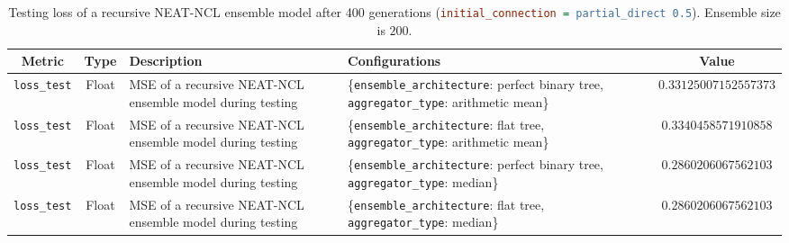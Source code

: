 \begin{table}[H]
    \centering
    \begin{tabular}{|c|c|p{4cm}|p{5cm}|c|}
        \hline
        Metric & Type & Description & Configurations & Value \\
        \hline
        \small\texttt{loss\_test} & Float & MSE of a recursive NEAT-NCL ensemble model during testing & \{\texttt{ensemble\_architecture}: perfect binary tree, \texttt{aggregator\_type}: arithmetic mean\} & $0.33125007152557373$ \\
        \hline
        \small\texttt{loss\_test} & Float & MSE of a recursive NEAT-NCL ensemble model during testing & \{\texttt{ensemble\_architecture}: flat tree, \texttt{aggregator\_type}: arithmetic mean\} & $0.3340458571910858$ \\
        \hline
        \small\texttt{loss\_test} & Float & MSE of a recursive NEAT-NCL ensemble model during testing & \{\texttt{ensemble\_architecture}: perfect binary tree, \texttt{aggregator\_type}: median\} & $0.2860206067562103$ \\
        \hline
        \small\texttt{loss\_test} & Float & MSE of a recursive NEAT-NCL ensemble model during testing & \{\texttt{ensemble\_architecture}: flat tree, \texttt{aggregator\_type}: median\} & $0.2860206067562103$ \\
        \hline
    \end{tabular}
    \caption{Testing loss of a recursive NEAT-NCL ensemble model after 400 generations (\lstinline[language=ini]|initial_connection = partial_direct 0.5|). Ensemble size is $200$. }
    \label{table:experiment_6_neat_ncl_partial_direct}
\end{table}

